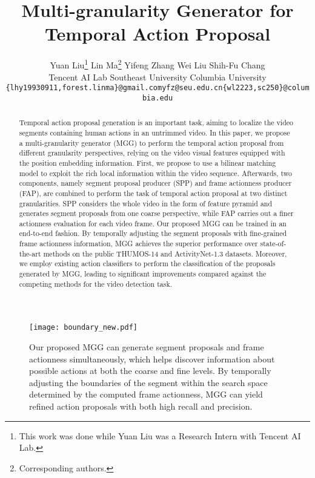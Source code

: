 \documentclass[10pt,twocolumn,letterpaper]{article}
\begin{document}
\title{Multi-granularity Generator for Temporal Action Proposal}
\date{}
\author{Yuan Liu\thanks{This work was done while Yuan Liu was a Research Intern with Tencent AI Lab. } \qquad
Lin Ma\thanks{Corresponding authors.}\qquad
Yifeng Zhang \qquad
Wei Liu \qquad
Shih-Fu Chang \\
Tencent AI Lab \qquad Southeast University \qquad Columbia University\\ 
{\tt\small \{lhy19930911,forest.linma\}@gmail.com\qquad yfz@seu.edu.cn\qquad  \{wl2223,sc250\}@columbia.edu}
}
\maketitle

\begin{abstract}
Temporal action proposal generation is an important task, aiming to localize the video segments containing human actions in an untrimmed video.
In this paper, we propose a multi-granularity generator (MGG) to perform the temporal action proposal from different granularity perspectives, relying on the video visual features equipped with the position embedding information. First, we propose to use a bilinear matching model to exploit the rich local information within the video sequence. Afterwards, two components, namely  segment proposal producer (SPP) and  frame actionness producer (FAP), are combined to perform the task of temporal action proposal at two distinct granularities. SPP considers the whole video in the form of feature pyramid and generates segment proposals from one coarse perspective, while FAP carries out a finer actionness evaluation for each video frame. Our proposed MGG can be trained in an end-to-end fashion. By temporally adjusting the segment proposals with fine-grained frame actionness information, MGG achieves  the superior performance over state-of-the-art methods on the public THUMOS-14 and
ActivityNet-1.3 datasets. Moreover, we employ existing action classifiers to perform the classification of the proposals generated by MGG, leading to significant improvements compared against the competing methods for the video detection task.
\end{abstract}

\begin{figure}[htbp]
\centering
\texttt{[image: boundary\_new.pdf]}
\caption{
Our proposed MGG can generate segment proposals and frame actionness simultaneously, which  helps discover information about possible actions at both the coarse and fine levels. By temporally adjusting the boundaries of the segment within the search space determined by the computed frame actionness, MGG can  yield refined action proposals with both high recall and precision.
 } 
 \label{boundary}
\end{figure} 
\end{document}

